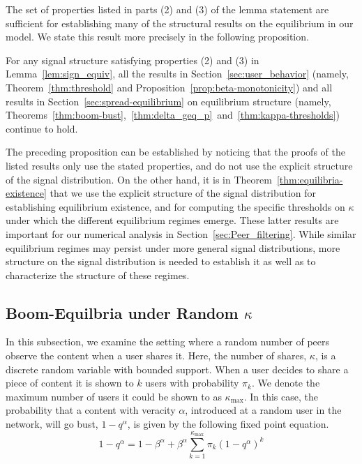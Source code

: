 The set of properties listed in parts (2) and (3) of the lemma statement are sufficient for establishing many of the structural results on the equilibrium in our model. We state this result more precisely in the following proposition.
\begin{proposition}
For any signal structure satisfying properties (2) and (3) in Lemma~\ref{lem:sign_equiv}, all the results in Section~\ref{sec:user_behavior} (namely, Theorem~\ref{thm:threshold} and Proposition~\ref{prop:beta-monotonicity}) and all results in Section~\ref{sec:spread-equilibrium} on equilibrium structure (namely, Theorems~\ref{thm:boom-bust},~\ref{thm:delta_geq_p}~and~\ref{thm:kappa-thresholds}) continue to hold. 
\end{proposition}
The preceding proposition can be established by noticing that the proofs of the listed results only use the stated properties, and do not use the explicit structure of the signal distribution. On the other hand, it is in Theorem~\ref{thm:equilibria-existence} that we use the explicit structure of the signal distribution for establishing equilibrium existence, and for computing the specific thresholds on $\kappa$ under which the different equilibrium regimes emerge. These latter results are important for our numerical analysis in Section~\ref{sec:Peer_filtering}. While similar equilibrium regimes may persist under more general signal distributions, more structure on the signal distribution is needed to establish it as well as to characterize the structure of these regimes.

\subsection{Boom-Equilbria under Random \texorpdfstring{$\kappa$}{k}}\label{sub:randomBoom}
In this subsection, we examine the setting where a random number of peers observe the content when a user shares it.  Here, the number of shares, $\kappa$, is a discrete random variable with bounded support.  When a user decides to share a piece of content it is shown to $k$ users with probability $\pi_k$. We denote the maximum number of users it could be shown to as $\kappa_{\max}$.   In this case, the probability that a content with veracity $\alpha$, introduced at a random user in the network, will go bust, $1 - q^{\alpha}$, is given by the following fixed point equation.
\begin{equation}\label{eq:non-det-viral-prob}
    1 -q^\alpha = 1 - \beta^\alpha + \beta^\alpha\sum_{k=1}^{\kappa_{\max}} \pi_k {\left(1 - q^\alpha\right)}^k 
\end{equation}

